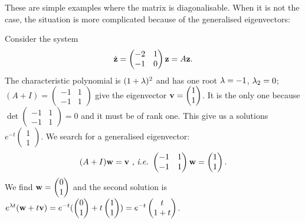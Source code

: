 These are simple examples where the matrix is diagonalisable. When it is not the case, the situation is more complicated because of the generalised eigenvectors:
\begin{exemple}
Consider the system
$$ \dot{\mathbf{z}}=
\begin{pmatrix} -2&1\\-1&0 \end{pmatrix}\mathbf{z} =A\mathbf{z}.
$$
The characteristic polynomial is $(1+\lambda)^2$ and has one root $\lambda=-1$, $\lambda_2=0$; $(A+I)=\begin{pmatrix} -1&1\\-1&1 \end{pmatrix}$ give the eigenvector $\mathbf{v}=\begin{pmatrix}1\\1\end{pmatrix}$. It is the only one because $\det \begin{pmatrix} -1&1\\-1&1 \end{pmatrix} =0$ and it must be of rank one. This give us a solutions $e^{-t}\begin{pmatrix}1\\1\end{pmatrix}$. We search for a generalised eigenvector:
$$(A+I)\mathbf{w}=\mathbf{v} \text{ , \emph{i.e.\ }} \begin{pmatrix} -1&1\\-1&1 \end{pmatrix}\mathbf{w}= \begin{pmatrix}1\\1\end{pmatrix}.$$
We find $\mathbf{w}=\begin{pmatrix}0\\1\end{pmatrix}$ and the second solution is $e^{\lambda t}(\mathbf{w}+t\mathbf{v}) = e^{-t}(\begin{pmatrix}0\\1\end{pmatrix}+t\begin{pmatrix}1\\1\end{pmatrix}) = e^{-t}\begin{pmatrix}t\\1+t\end{pmatrix}$.
\begin{figure}[H]
    \centering

\end{figure}
\end{exemple}
